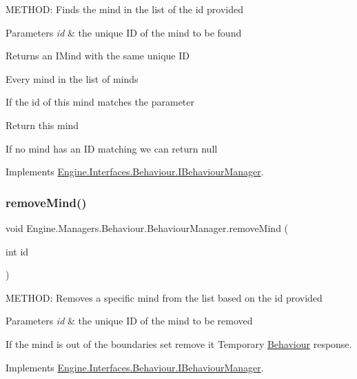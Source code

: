 M\+E\+T\+H\+OD\+: Finds the mind in the list of the id provided 


\begin{DoxyParams}{Parameters}
{\em id} & the unique ID of the mind to be found\\
\hline
\end{DoxyParams}
\begin{DoxyReturn}{Returns}
an I\+Mind with the same unique ID
\end{DoxyReturn}
Every mind in the list of minds

If the id of this mind matches the parameter

Return this mind

If no mind has an ID matching we can return null 

Implements \hyperlink{a00418_ac1d24fb690a665ce8c70671b7c27b9ad}{Engine.\+Interfaces.\+Behaviour.\+I\+Behaviour\+Manager}.

\mbox{\label{a00486_a684853fb49121d19f4d5c635153b871a}} 
\subsubsection{\texorpdfstring{remove\+Mind()}{removeMind()}}
{\footnotesize\ttfamily void Engine.\+Managers.\+Behaviour.\+Behaviour\+Manager.\+remove\+Mind (\begin{DoxyParamCaption}\item[{int}]{id }\end{DoxyParamCaption})\hspace{0.3cm}{\ttfamily [inline]}}



M\+E\+T\+H\+OD\+: Removes a specific mind from the list based on the id provided 


\begin{DoxyParams}{Parameters}
{\em id} & the unique ID of the mind to be removed\\
\hline
\end{DoxyParams}
If the mind is out of the boundaries set remove it Temporary \hyperlink{a00266}{Behaviour} response. 

Implements \hyperlink{a00418_a6f89adf3a1d8286a73b534855847c414}{Engine.\+Interfaces.\+Behaviour.\+I\+Behaviour\+Manager}.

